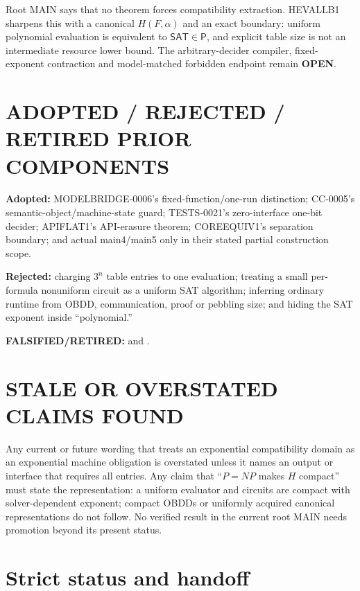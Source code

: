 \documentclass[11pt]{article}
\newcommand{\SAT}{\mathsf{SAT}}
\newcommand{\OPEN}{\textbf{OPEN}}
\begin{document}
Root MAIN says that no theorem forces compatibility extraction.  HEVALLB1
sharpens this with a canonical $H(F,\alpha)$ and an exact boundary:
uniform polynomial evaluation is equivalent to $\SAT\in\mathsf P$, and
explicit table size is not an intermediate resource lower bound.  The
arbitrary-decider compiler, fixed-exponent contraction and model-matched
forbidden endpoint remain \OPEN.

\section{ADOPTED / REJECTED / RETIRED PRIOR COMPONENTS}

\textbf{Adopted:} MODELBRIDGE-0006's fixed-function/one-run distinction;
CC-0005's semantic-object/machine-state guard; TESTS-0021's zero-interface
one-bit decider; APIFLAT1's API-erasure theorem; COREEQUIV1's separation
boundary; and actual main4/main5 only in their stated partial construction
scope.

\textbf{Rejected:} charging $3^n$ table entries to one evaluation; treating a
small per-formula nonuniform circuit as a uniform SAT algorithm; inferring
ordinary runtime from OBDD, communication, proof or pebbling size; and hiding
the SAT exponent inside ``polynomial.''

\textbf{FALSIFIED/RETIRED:}
 and
.

\section{STALE OR OVERSTATED CLAIMS FOUND}

Any current or future wording that treats an exponential compatibility domain
as an exponential machine obligation is overstated unless it names an output
or interface that requires all entries.  Any claim that ``$P=NP$ makes $H$
compact'' must state the representation: a uniform evaluator and circuits are
compact with solver-dependent exponent; compact OBDDs or uniformly acquired
canonical representations do not follow.  No verified result in the current
root MAIN needs promotion beyond its present status.

\section{Strict status and handoff}
\end{document}
